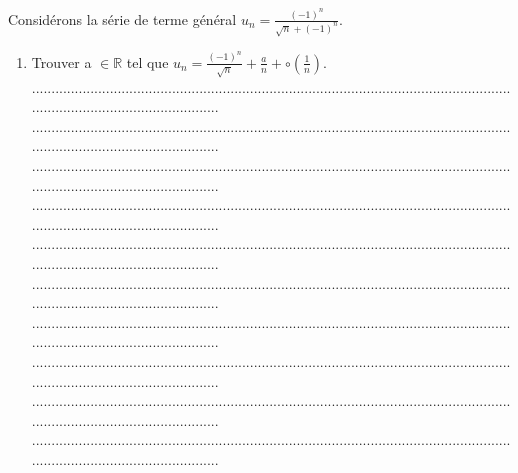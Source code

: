 \documentclass{article}
\begin{document}
\begin{footnotesize}
Considérons la série de terme général $u_{n} = \frac{(-1)^{n}}{\sqrt{n}+(-1)^{n}}$.
\begin{enumerate}
    \item Trouver a $\in \mathbb{R}$ tel que $u_{n} = \frac{(-1)^{n}}{\sqrt{n}} + \frac{a}{n} + \circ(\frac{1}{n})$.\newline\newline
    ...........................................................................................................................................................................\newline
    ...........................................................................................................................................................................\newline
    ...........................................................................................................................................................................\newline
    ...........................................................................................................................................................................\newline
    ...........................................................................................................................................................................\newline
    ...........................................................................................................................................................................\newline
    ...........................................................................................................................................................................\newline
    ...........................................................................................................................................................................\newline
    ...........................................................................................................................................................................\newline
    ...........................................................................................................................................................................\newline\newline

\end{enumerate}
\end{footnotesize}
\end{document}
